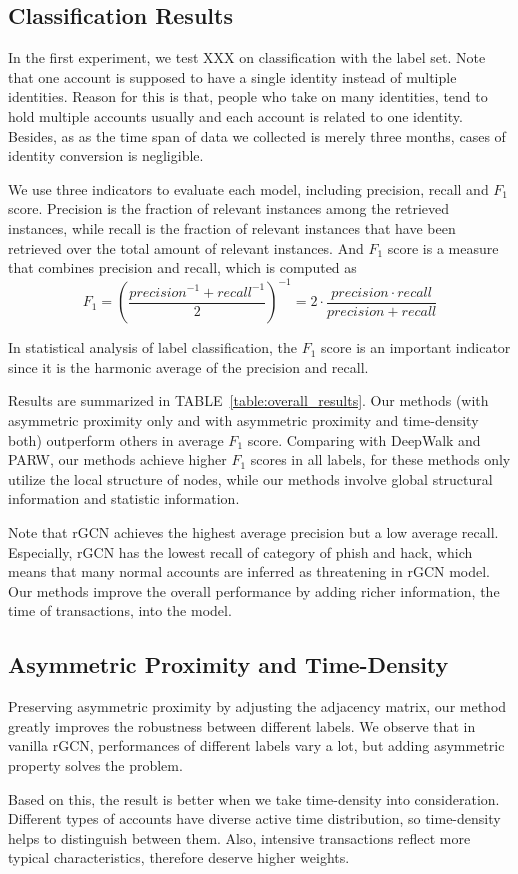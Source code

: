 \subsection{Classification Results}
In the first experiment, we test XXX on classification with the label set. Note that one account is supposed to have a single identity instead of multiple identities. Reason for this is that, people who take on many identities, tend to hold multiple accounts usually and each account is related to one identity. Besides, as as the time span of data we collected is merely three months, cases of identity conversion is negligible.

We use three indicators to evaluate each model, including precision, recall and $F_1$ score. Precision is the fraction of relevant instances among the retrieved instances, while recall is the fraction of relevant instances that have been retrieved over the total amount of relevant instances. And $F_1$ score is a measure that combines precision and recall, which is computed as
\begin{equation}
F_1=(\frac{{precision}^{-1}+{recall}^{-1}}{2})^{-1}=2\cdot\frac{precision \cdot recall}{precision + recall}
\end{equation}

In statistical analysis of label classification, the $F_1$ score is an important indicator since it is the harmonic average of the precision and recall.

Results are summarized in TABLE~\ref{table:overall_results}. Our methods (with asymmetric proximity only and with asymmetric proximity and time-density both) outperform others in average $F_1$ score. Comparing with DeepWalk and PARW, our methods achieve higher $F_1$ scores in all labels, for these methods only utilize the local structure of nodes, while our methods involve global structural information and statistic information. 

Note that rGCN achieves the highest average precision but a low average recall. Especially, rGCN has the lowest recall of category of phish and hack, which means that many normal accounts are inferred as threatening in rGCN model. Our methods improve the overall performance by adding richer information, the time of transactions, into the model.

\subsection{Asymmetric Proximity and Time-Density}
Preserving asymmetric proximity by adjusting the adjacency matrix, our method greatly improves the robustness between different labels. We observe that in vanilla rGCN, performances of different labels vary a lot, but adding asymmetric property solves the problem. %

Based on this, the result is better when we take time-density into consideration. Different types of accounts have diverse active time distribution, so time-density helps to distinguish between them. Also, intensive transactions reflect more typical characteristics, therefore deserve higher weights.


